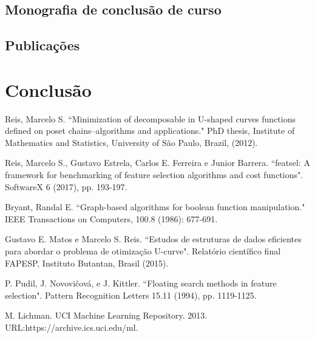 \documentclass[12pt]{article}
\begin{document}
\subsection{Monografia de conclusão de curso}

\subsection{Publicações}

\section{Conclusão} 
\pagebreak


\begin{thebibliography}{9} \label{sec:referencias}


Reis, Marcelo S. ``Minimization of decomposable in U-shaped curves functions defined on poset chains–algorithms and applications." PhD thesis, Institute of Mathematics and Statistics, University of São Paulo, Brazil, (2012).

Reis, Marcelo S., Gustavo Estrela, Carlos E. Ferreira e Junior Barrera.
``featsel: A framework for benchmarking of feature selection algorithms
and cost functions". SoftwareX 6 (2017), pp. 193-197.

Bryant, Randal E. ``Graph-based algorithms for boolean function manipulation." IEEE Transactions on Computers, 100.8 (1986): 677-691. 

Gustavo E. Matos e Marcelo S. Reis. ``Estudos de estruturas de dados 
eficientes para abordar o problema de otimização U-curve". Relatório
científico final FAPESP, Instituto Butantan, Brasil (2015).

P. Pudil, J. Novovičová, e J. Kittler. ``Floating search methods in feature selection". 
Pattern Recognition Letters 15.11 (1994), pp. 1119-1125.


M. Lichman. UCI Machine Learning Repository. 2013. 
URL:https://archive.ics.uci.edu/ml.

\end{thebibliography}
\end{document}
